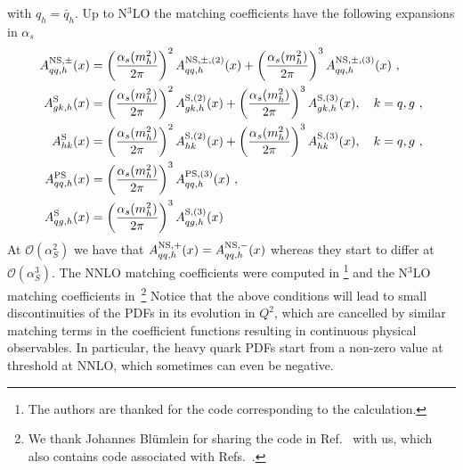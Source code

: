 with $q_h=\bar{q}_h$. Up to N$^3$LO the matching coefficients have the
following expansions in $\alpha_s$
\begin{align}
  A^{\rm NS,\pm}_{qq,h}(x) & = \left( \frac{\alpha_s(m_h^2)}{2\pi} \right)^2
  A^{\rm NS,\pm,(2)}_{qq,h}(x) + \left( \frac{\alpha_s(m_h^2)}{2\pi} \right)^3
  A^{\rm NS,\pm,(3)}_{qq,h}(x) \ , \nonumber \\
  A^{\rm S}_{gk,h}(x) & = \left( \frac{\alpha_s(m_h^2)}{2\pi} \right)^2
  A^{\rm S,(2)}_{gk,h}(x) + \left( \frac{\alpha_s(m_h^2)}{2\pi} \right)^3
  A^{\rm S,(3)}_{gk,h}(x), \quad k=q,g \ , \nonumber \\
  A^{\rm S}_{hk}(x) & = \left( \frac{\alpha_s(m_h^2)}{2\pi} \right)^2
  A^{\rm S,(2)}_{hk}(x) + \left( \frac{\alpha_s(m_h^2)}{2\pi} \right)^3
  A^{\rm S,(3)}_{hk}(x), \quad k=q,g \ , \nonumber \\
  A^{\rm PS}_{qq,h}(x) & = \left( \frac{\alpha_s(m_h^2)}{2\pi} \right)^3
  A^{\rm PS,(3)}_{qq,h}(x) \ , \nonumber \\
  A^{\rm S}_{qg,h}(x) & = \left( \frac{\alpha_s(m_h^2)}{2\pi} \right)^3
  A^{\rm S,(3)}_{qg,h}(x)
\end{align}
At $\mathcal{O}(\alpha_S^2)$ we have that $A^{\rm NS,+}_{qq,h}(x) =
A^{\rm NS,-}_{qq,h}(x)$ whereas they start to differ at
$\mathcal{O}(\alpha_S^3)$. The NNLO matching coefficients were
computed in \cite{NNLO-MTM}\footnote{The authors are thanked for the
code corresponding to the calculation.} and the N$^3$LO matching
coefficients
in~\cite{Bierenbaum:2009mv,Ablinger:2010ty,Kawamura:2012cr,Blumlein:2012vq,ABLINGER2014263,Ablinger:2014nga,Ablinger:2014vwa,Behring:2014eya,Ablinger:2019etw,Behring:2021asx,Fael:2022miw,Ablinger:2023ahe,Ablinger:2024xtt,BlumleinCode}\footnote{We
thank Johannes Bl\"umlein for sharing the code in
Ref.~\cite{BlumleinCode} with us, which also contains code associated
with Refs.~\cite{Ablinger:2024xtt,Fael:2022miw}.
%
}
%
Notice that the above
conditions will lead to small discontinuities of the PDFs in its
evolution in $Q^2$, which are cancelled by similar matching terms in
the coefficient functions resulting in continuous physical
observables. In particular, the heavy quark PDFs start from a non-zero
value at threshold at NNLO, which sometimes can even be negative.

